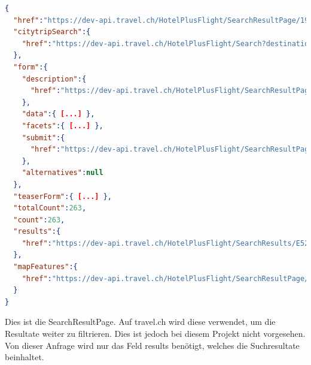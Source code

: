 \begin{lstlisting}[language=json,firstnumber=1]
{
  "href":"https://dev-api.travel.ch/HotelPlusFlight/SearchResultPage/19E2B6BB-1F06-4396-B86E-169EDB368B0E?sortMethod.type=https%3A%2F%2Fdev-api.travel.ch%2FSortType%2FPrice&ratings.minimal=0[...]",
  "citytripSearch":{
    "href":"https://dev-api.travel.ch/HotelPlusFlight/Search?destination=https%3A%2F%2Fdev-api.travel.ch%2FDestination%2F6547539&periodOfStay.checkInDate=2016-10-05&periodOfStay.checkOutDate=2016-10-08[...]"
  },
  "form":{
    "description":{
      "href":"https://dev-api.travel.ch/HotelPlusFlight/SearchResultPageFormDescription/19E2B6BB-1F06-4396-B86E-169EDB368B0E?searchResultPageId=E5241069-1272-4DD0-946E-46DD2E9D55E6"
    },
    "data":{ [...] },
    "facets":{ [...] },
    "submit":{
      "href":"https://dev-api.travel.ch/HotelPlusFlight/SearchResultPage/19E2B6BB-1F06-4396-B86E-169EDB368B0E{?paging.offset,paging.size,[...],luggageOptions*}"
    },
    "alternatives":null
  },
  "teaserForm":{ [...] },
  "totalCount":263,
  "count":263,
  "results":{
    "href":"https://dev-api.travel.ch/HotelPlusFlight/SearchResults/E5241069-1272-4DD0-946E-46DD2E9D55E6"
  },
  "mapFeatures":{
    "href":"https://dev-api.travel.ch/HotelPlusFlight/SearchResultPage/E5241069-1272-4DD0-946E-46DD2E9D55E6/Map"
  }
}
\end{lstlisting}
Dies ist die SearchResultPage. Auf travel.ch wird diese verwendet, um die Resultate weiter zu filtrieren. Dies ist jedoch bei diesem Projekt nicht vorgesehen. Von dieser Anfrage wird nur das Feld results benötigt, welches die Suchresultate beinhaltet.

